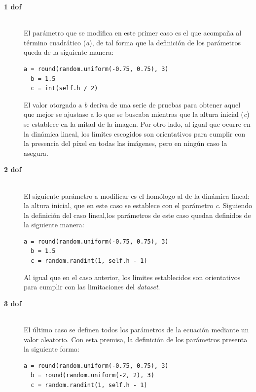 \begin{description}
\item[\textbf{1 \acrshort{dof}}] \hfill 
\vspace{10pt}
\\
El parámetro que se modifica en este primer caso es el que acompaña al término cuadrático (\textit{a}), de tal forma que la definición de los parámetros queda de la siguiente manera: 
\vspace{10pt}
\begin{lstlisting}[frame=single]
  a = round(random.uniform(-0.75, 0.75), 3)
  b = 1.5
  c = int(self.h / 2)
\end{lstlisting}
El valor otorgado a \textit{b} deriva de una serie de pruebas para obtener aquel que mejor se ajustase a lo que se buscaba mientras que la altura inicial (\textit{c}) se establece en la mitad de la imagen. Por otro lado, al igual que ocurre en la dinámica lineal, los límites escogidos son orientativos para cumplir con la presencia del píxel en todas las imágenes, pero en ningún caso la asegura. 
\vspace{10pt}
	
\item[\textbf{2 \acrshort{dof}}] \hfill 
\vspace{10pt}
\\
El siguiente parámetro a modificar es el homólogo al de la dinámica lineal: la altura inicial, que en este caso se establece con el parámetro \textit{c}. Siguiendo la definición del caso lineal,los parámetros de este caso quedan definidos de la siguiente manera:
\vspace{10pt}
\begin{lstlisting}[frame=single]
  a = round(random.uniform(-0.75, 0.75), 3)
  b = 1.5
  c = random.randint(1, self.h - 1)
\end{lstlisting}
Al igual que en el caso anterior, los límites establecidos son orientativos para cumplir con las limitaciones del \textit{dataset}.
\vspace{10pt}

\item[\textbf{3 \acrshort{dof}}] \hfill 
\vspace{10pt}
\\
El último caso se definen todos los parámetros de la ecuación mediante un valor aleatorio. Con esta premisa, la definición de los parámetros presenta la siguiente forma:
\vspace{10pt}
\begin{lstlisting}[frame=single]
  a = round(random.uniform(-0.75, 0.75), 3)
  b = round(random.uniform(-2, 2), 3)
  c = random.randint(1, self.h - 1)
\end{lstlisting}
\vspace{10pt}

\end{description}

